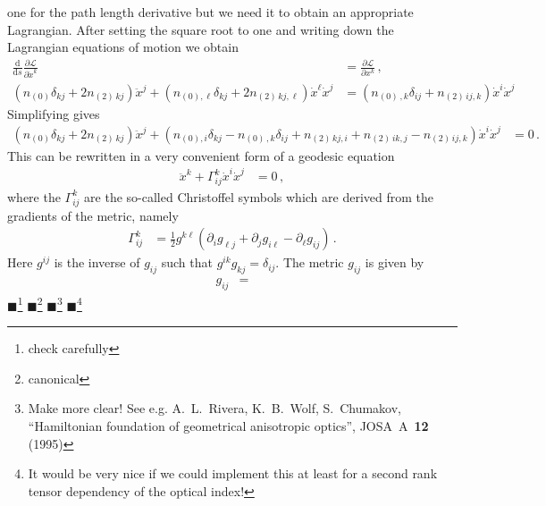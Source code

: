 \documentclass[12pt,a4paper,twoside,openright,BCOR10mm,headsepline,titlepage,abstracton,chapterprefix,final]{scrreprt}
\newcommand{\remark}[1]{{\color{red}$\blacksquare$}\footnote{{\color{red}#1}}}
\begin{document}
one for the path length derivative but we need it to obtain an appropriate Lagrangian. After setting the square root to one and writing down
the Lagrangian equations of motion we obtain
\begin{align}
  \frac{\text{d}}{\text{d}s} \frac{\partial \mathcal{L}}{\partial \dot{x}^k} &= \frac{\partial \mathcal{L}}{\partial x^k}\,,\nonumber\\
  (n_{(0)} \delta_{kj} + 2 n_{(2)\,kj}) \ddot{x}^j + (n_{(0),\ell} \delta_{kj} + 2 n_{(2)\,kj,\ell}) \dot{x}^\ell \dot{x}^j &= 
  (n_{(0)\,,k} \delta_{ij} + n_{(2)\,ij,k}) \dot{x}^i \dot{x}^j 
\end{align}
Simplifying gives
\begin{align}
 (n_{(0)} \delta_{kj} + 2 n_{(2)\,kj}) \ddot{x}^j + (n_{(0),i} \delta_{kj} - n_{(0)\,,k} \delta_{ij} + n_{(2)\,kj,i} + n_{(2)\,ik,j} - n_{(2)\,ij,k}) \dot{x}^i \dot{x}^j &=0\,. 
\end{align}
This can be rewritten in a very convenient form of a geodesic equation
\begin{align}
 \ddot{x}^k + \Gamma^k_{ij} \dot{x}^i \dot{x}^j &= 0\,,
\end{align}
where the $\Gamma^k_{ij}$ are the so-called Christoffel symbols which are derived from the gradients of the metric, namely
\begin{align}
 \Gamma^k_{ij} &= \frac{1}{2} g^{k\ell} \left(\partial_i g_{\ell j} + \partial_j g_{i \ell} - \partial_\ell g_{ij}\right)\,.
\end{align}
Here $g^{ij}$ is the inverse of $g_{ij}$ such that $g^{ik} g_{kj} = \delta_{ij}$. The metric $g_{ij}$ is given by
\begin{align}
 g_{ij} &= 
\end{align}
\remark{check carefully}
\remark{canonical}
\remark{Make more clear! See e.g. A.~L.~Rivera, K.~B.~Wolf, S.~Chumakov, ``Hamiltonian foundation of geometrical anisotropic optics'', JOSA~A~{\bf 12} (1995)}
\remark{It would be very nice if we could implement this at least for a second rank tensor dependency of the optical index!}
\end{document}
